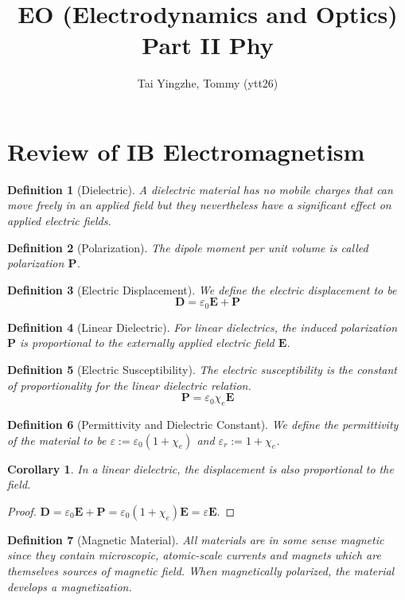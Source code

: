 \documentclass[a4paper]{article}
\title{\textbf{EO (Electrodynamics and Optics) Part II Phy}}
\author{Tai Yingzhe, Tommy (ytt26)}
\date{}
\theoremstyle{new}
\newtheorem{defi}{Definition}[section]
\newtheorem{cor}{Corollary}[section]
\begin{document}
\maketitle
{\small\tableofcontents}

\newpage
\section{Review of IB Electromagnetism}
\begin{defi}[Dielectric]
A dielectric material has no mobile charges that can move freely in an applied field but they nevertheless have a significant effect on applied electric fields. 
\end{defi}
\begin{defi}[Polarization]
The dipole moment per unit volume is called polarization $\mathbf{P}$.
\end{defi}
\begin{defi}[Electric Displacement]
We define the electric displacement to be
$$\mathbf{D}=\varepsilon_0\mathbf{E}+\mathbf{P}$$
\end{defi}
\begin{defi}[Linear Dielectric]
For linear dielectrics, the induced polarization $\mathbf{P}$ is proportional to the externally applied electric field $\mathbf{E}$.
\end{defi}
\begin{defi}[Electric Susceptibility]
The electric susceptibility is the constant of proportionality for the linear dielectric relation.
$$\mathbf{P}=\varepsilon_0\chi_e\mathbf{E}$$
\end{defi}
\begin{defi}[Permittivity and Dielectric Constant]
We define the permittivity of the material to be $\varepsilon:=\varepsilon_0(1+\chi_e)$ and $\varepsilon_r:=1+\chi_e$.
\end{defi}
\begin{cor}
In a linear dielectric, the displacement is also proportional to the field.
\end{cor}
\begin{proof}
$\mathbf{D}=\varepsilon_0\mathbf{E}+\mathbf{P}=\varepsilon_0(1+\chi_e)\mathbf{E}=\varepsilon\mathbf{E}$.
\end{proof}
\begin{defi}[Magnetic Material]
All materials are in some sense magnetic since they contain microscopic, atomic-scale currents and magnets which are themselves sources of magnetic field. When magnetically polarized, the material develops a magnetization.
\end{defi}
\end{document}
